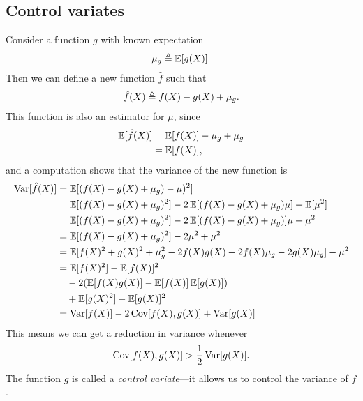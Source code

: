   \subsection{Control variates}
  Consider a function $g$ with known expectation
  \begin{align*}
    \mu_{g} \triangleq \operatorname{\mathbb{E}} [ g(X) ].
  \end{align*}
  Then we can define a new function $\hat{f}$ such that
  \begin{align*}
    \hat{f}(X) \triangleq f(X) - g(X) + \mu_{g}.
  \end{align*}
  This function is also an estimator for $\mu$, since
  \begin{align*}
      \operatorname{\mathbb{E}} [ \hat{f}(X) ] &= \operatorname{\mathbb{E}} [ f(X) ] - \mu_{g} + \mu_{g} \\
          &= \operatorname{\mathbb{E}} [ f(X) ],
  \end{align*}
  and a computation shows that the variance of the new function is
  \begin{align*}
    \operatorname{Var} [ \hat{f}(X) ]
      &= \operatorname{\mathbb{E}} [ (f(X) - g(X) + \mu_{g}) - \mu)^2 ] \\
      &= \operatorname{\mathbb{E}} [ (f(X) - g(X) + \mu_{g})^2 ] - 2\operatorname{\mathbb{E}} [ (f(X) - g(X) + \mu_{g})\mu ] + \operatorname{\mathbb{E}} [ \mu^2 ] \\
      &= \operatorname{\mathbb{E}} [ (f(X) - g(X) + \mu_{g})^2 ] - 2\operatorname{\mathbb{E}} [ (f(X) - g(X) + \mu_{g})]\mu + \mu^2 \\
      &= \operatorname{\mathbb{E}} [ (f(X) - g(X) + \mu_{g})^2 ] - 2\mu^2  + \mu^2 \\
      &= \operatorname{\mathbb{E}} [ f(X)^2 + g(X)^2 + \mu_{g}^2 - 2f(X)g(X) + 2f(X)\mu_{g} - 2g(X)\mu_{g} ] - \mu^2\\
      &= \operatorname{\mathbb{E}} [ f(X)^2 ] - \operatorname{\mathbb{E}} [ f(X) ]^2 \\
        &\quad - 2(\operatorname{\mathbb{E}} [ f(X)g(X) ] - \operatorname{\mathbb{E}} [ f(X) ]\operatorname{\mathbb{E}} [ g(X) ]) \\
        &\quad + \operatorname{\mathbb{E}} [ g(X)^2 ] - \operatorname{\mathbb{E}} [ g(X) ]^2 \\
      &= \operatorname{Var} [ f(X) ] - 2  \operatorname{Cov} [ f(X), g(X) ] + \operatorname{Var} [ g(X) ]
  \end{align*}
  This means we can get a reduction in variance whenever
  \begin{equation*}
    \operatorname{Cov} [ f(X), g(X) ] > \frac{1}{2} \operatorname{Var} [ g(X) ].
  \end{equation*}
  The function $g$ is called a \textit{control variate}---it allows us to control the variance of $f$.

